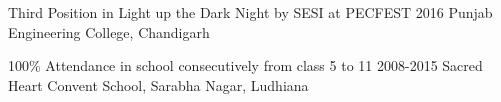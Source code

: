 \begin{entryzlist}

\entryz

{Third Position {\normalfont in Light up the Dark Night by SESI at PECFEST}}
{2016}
{Punjab Engineering College, Chandigarh}


\entryz

{100\% Attendance {\normalfont in school consecutively from class 5 to 11}}
{2008-2015}
{Sacred Heart Convent School, Sarabha Nagar, Ludhiana}


\end{entryzlist}